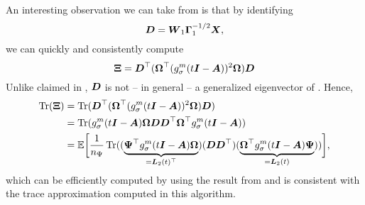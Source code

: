 An interesting observation we can take from 
is that by identifying
\begin{equation}
    \boldsymbol{D} = \boldsymbol{W}_1 \boldsymbol{\Gamma}_1^{-1/2} \boldsymbol{X},
    \label{equ:4-nystromchebyshev-generalized-eigenvector}
\end{equation}
we can quickly and consistently compute
\begin{equation}
    \boldsymbol{\Xi} = \boldsymbol{D}^{\top} (\boldsymbol{\Omega}^{\top} (g_{\sigma}^m(t\boldsymbol{I} - \boldsymbol{A}))^2 \boldsymbol{\Omega}) \boldsymbol{D}
    \label{equ:4-nystromchebyshev-generalized-eigenvector-xi}
\end{equation}
Unlike claimed in \cite[algorithm~4]{lin2017randomized}, $\boldsymbol{D}$ is not -- in general --
a generalized eigenvector of .
Hence,
\begin{align}
    \operatorname{Tr}(\boldsymbol{\Xi})
    &= \operatorname{Tr}(\boldsymbol{D}^{\top} (\boldsymbol{\Omega}^{\top} (g_{\sigma}^m(t\boldsymbol{I} - \boldsymbol{A}))^2 \boldsymbol{\Omega}) \boldsymbol{D}) \notag \\
    &= \operatorname{Tr}( g_{\sigma}^m(t\boldsymbol{I} - \boldsymbol{A}) \boldsymbol{\Omega} \boldsymbol{D} \boldsymbol{D}^{\top} \boldsymbol{\Omega}^{\top} g_{\sigma}^m(t\boldsymbol{I} - \boldsymbol{A})) \notag \\
    &= \mathbb{E}\bigg[\frac{1}{n_{\Psi}} \operatorname{Tr}( (\underbrace{\boldsymbol{\Psi}^{\top} g_{\sigma}^m(t\boldsymbol{I} - \boldsymbol{A}) \boldsymbol{\Omega}}_{=\boldsymbol{L}_2(t)^{\top}})
                                               (\boldsymbol{D} \boldsymbol{D}^{\top})
                                               (\underbrace{\boldsymbol{\Omega}^{\top} g_{\sigma}^m(t\boldsymbol{I} - \boldsymbol{A}) \boldsymbol{\Psi}}_{=\boldsymbol{L}_2(t)})) \bigg],
    \label{equ:4-nystromchebyshev-generalized-eigenvector-trace}
\end{align}
which can be efficiently computed by using the result from 
and is consistent with the trace approximation computed in this algorithm.


%
%

